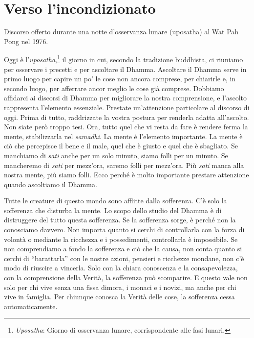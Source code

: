 \chapter{Verso l'incondizionato}

\begin{openingQuote}
  \centering

  Discorso offerto durante una notte d'osservanza lunare (uposatha) al
  Wat Pah Pong nel 1976.
\end{openingQuote}

Oggi è l'\emph{uposatha},\footnote{\emph{Uposatha}: Giorno di osservanza
  lunare, corrispondente alle fasi lunari.} il giorno in cui, secondo la
tradizione buddhista, ci riuniamo per osservare i precetti e per
ascoltare il Dhamma. Ascoltare il Dhamma serve in primo luogo per capire
un po' le cose non ancora comprese, per chiarirle e, in secondo luogo,
per afferrare ancor meglio le cose già comprese. Dobbiamo affidarci ai
discorsi di Dhamma per migliorare la nostra comprensione, e l'ascolto
rappresenta l'elemento essenziale. Prestate un'attenzione particolare al
discorso di oggi. Prima di tutto, raddrizzate la vostra postura per
renderla adatta all'ascolto. Non siate però troppo tesi. Ora, tutto quel
che vi resta da fare è rendere ferma la mente, stabilizzarla nel
\emph{samādhi}. La mente è l'elemento importante. La mente è ciò che
percepisce il bene e il male, quel che è giusto e quel che è sbagliato.
Se manchiamo di \emph{sati} anche per un solo minuto, siamo folli per un
minuto. Se mancheremo di \emph{sati} per mezz'ora, saremo folli per
mezz'ora. Più \emph{sati} manca alla nostra mente, più siamo folli. Ecco
perché è molto importante prestare attenzione quando ascoltiamo il
Dhamma.

Tutte le creature di questo mondo sono afflitte dalla sofferenza. C'è
solo la sofferenza che disturba la mente. Lo scopo dello studio del
Dhamma è di distruggere del tutto questa sofferenza. Se la sofferenza
sorge, è perché non la conosciamo davvero. Non importa quanto si cerchi
di controllarla con la forza di volontà o mediante la ricchezza e i
possedimenti, controllarla è impossibile. Se non comprendiamo a fondo la
sofferenza e ciò che la causa, non conta quanto si cerchi di
``barattarla'' con le nostre azioni, pensieri e ricchezze mondane, non
c'è modo di riuscire a vincerla. Solo con la chiara conoscenza e la
consapevolezza, con la comprensione della Verità, la sofferenza può
scomparire. E questo vale non solo per chi vive senza una fissa dimora,
i monaci e i novizi, ma anche per chi vive in famiglia. Per chiunque
conosca la Verità delle cose, la sofferenza cessa automaticamente.

